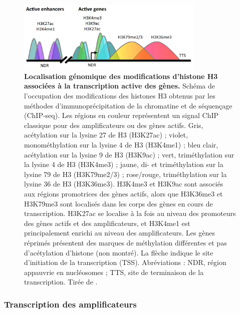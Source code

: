 \begin{figure}[h]
 \centering
 \includegraphics[width=0.8\textwidth, page=1] {figures/introduction/fig9.png}
 \caption[Localisation génomique des modifications d'histone H3 associées à la transcription active des gènes.]{
 \textbf{Localisation génomique des modifications d'histone H3 associées à la transcription active des gènes.}
 Schéma de l'occupation des modifications des histones H3 obtenus par les méthodes d'immunoprécipitation de la chromatine et de séquençage (\acrshort{ChIP-seq}). Les régions en couleur représentent un signal ChIP classique pour des \glspl{amplificateur} ou des gènes actifs.
 Gris, acétylation sur la lysine 27 de H3 (H3K27ac) ; violet, monométhylation sur la lysine 4 de H3 (H3K4me1) ; bleu clair, acétylation sur la lysine 9 de H3 (H3K9ac) ; vert, triméthylation sur la lysine 4 de H3 (H3K4me3) ; jaune, di- et triméthylation sur la lysine 79 de H3 (H3K79me2/3) ; rose/rouge, triméthylation sur la lysine 36 de H3 (H3K36me3). H3K4me3 et H3K9ac sont associés aux régions promotrices des gènes actifs, alors que H3K36me3 et H3K79me3 sont localisés dans les corps des gènes en cours de transcription. H3K27ac se localise à la fois au niveau des promoteurs des gènes actifs et des amplificateurs, et H3K4me1 est principalement enrichi au niveau des amplificateurs.
 Les gènes réprimés présentent des marques de méthylation différentes et pas d'acétylation d'histone (non montré). La flèche indique le site d'initiation de la transcription (\acrshort{TSS}). 
 Abréviations : NDR, région appauvrie en nucléosomes ; TTS, site de terminaison de la transcription. Tirée de \citet{bernstein_genomic_2005}.\\
 }
 \label{fig:Fig9}
\end{figure}

\subsubsection{Transcription des amplificateurs}
\label{subsubsec:eRNA}


